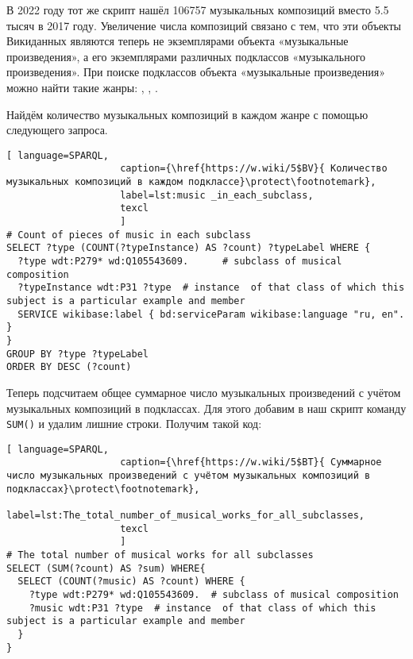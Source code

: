 В 2022 году тот же скрипт нашёл \num{106757} музыкальных композиций вместо \num{5,5} тысяч в 2017 году. Увеличение числа композиций связано с тем, что эти объекты Викиданных являются теперь не экземплярами объекта «музыкальные произведения», а его экземплярами различных подклассов «музыкального произведения». При поиске подклассов объекта «музыкальные произведения» можно найти такие жанры: , , .

Найдём количество музыкальных композиций в каждом жанре с помощью следующего запроса.

\begin{lstlisting}[ language=SPARQL,
                    caption={\href{https://w.wiki/5$BV}{ Количество музыкальных композиций в каждом подклассе}\protect\footnotemark},
                    label=lst:music _in_each_subclass,
                    texcl 
                    ]
# Count of pieces of music in each subclass
SELECT ?type (COUNT(?typeInstance) AS ?count) ?typeLabel WHERE {
  ?type wdt:P279* wd:Q105543609.      # subclass of musical composition
  ?typeInstance wdt:P31 ?type  # instance  of that class of which this subject is a particular example and member
  SERVICE wikibase:label { bd:serviceParam wikibase:language "ru, en". }
}
GROUP BY ?type ?typeLabel
ORDER BY DESC (?count)
\end{lstlisting}%

Теперь подсчитаем общее суммарное число музыкальных произведений с учётом музыкальных композиций в подклассах. Для этого добавим в наш скрипт команду \lstinline|SUM()| и удалим лишние строки. Получим такой код:

\begin{lstlisting}[ language=SPARQL,
                    caption={\href{https://w.wiki/5$BT}{ Суммарное число музыкальных произведений с учётом музыкальных композиций в подклассах}\protect\footnotemark},
                    label=lst:The_total_number_of_musical_works_for_all_subclasses,
                    texcl 
                    ]
# The total number of musical works for all subclasses 
SELECT (SUM(?count) AS ?sum) WHERE{
  SELECT (COUNT(?music) AS ?count) WHERE {
    ?type wdt:P279* wd:Q105543609.  # subclass of musical composition
    ?music wdt:P31 ?type  # instance  of that class of which this subject is a particular example and member
  }
}
\end{lstlisting}%

